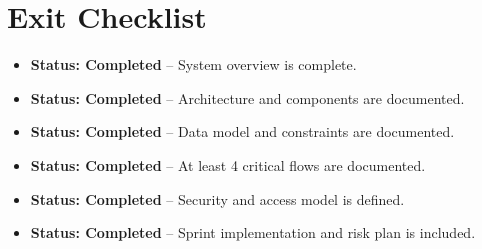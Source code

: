 \documentclass[12pt,a4paper]{article}
\begin{document}
\section{Exit Checklist}
\begin{itemize}
    \item \textbf{Status: Completed} -- System overview is complete.
    \item \textbf{Status: Completed} -- Architecture and components are documented.
    \item \textbf{Status: Completed} -- Data model and constraints are documented.
    \item \textbf{Status: Completed} -- At least 4 critical flows are documented.
    \item \textbf{Status: Completed} -- Security and access model is defined.
    \item \textbf{Status: Completed} -- Sprint implementation and risk plan is included.
\end{itemize}
\end{document}
